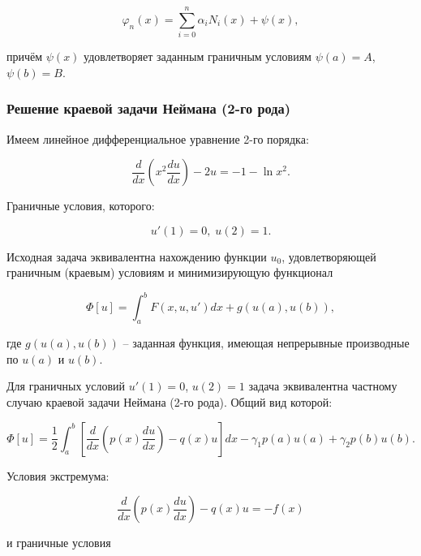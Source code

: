 \documentclass{article}
\begin{document}
\begin{equation}\label{equation_solve_var_rank_2}
	\varphi_{n}(x) = \sum_{i=0}^n \alpha_{i}N_{i}(x) + \psi(x),
\end{equation}

\noindent причём $\psi(x)$ удовлетворяет заданным граничным условиям $\psi(a) = A$, $\psi(b) = B$.

\subsubsection{Решение краевой задачи Неймана (2-го рода)}

Имеем линейное дифференциальное уравнение 2-го порядка:

\begin{equation}\label{equation_rang_2}
	\frac{d}{dx} \left( x^2 \frac{d u}{dx} \right) - 2u = -1 - \ln{x^2}.
\end{equation}

\noindent Граничные условия, которого:

\begin{displaymath}
	u'(1) = 0, \; u(2) = 1.
\end{displaymath}

Исходная задача эквивалентна нахождению функции $u_{0}$, удовлетворяющей граничным (краевым) условиям и минимизирующую функционал

\begin{displaymath}
	\Phi[u] = \int_{a}^{b} F(x, u, u')dx + g(u(a), u(b)),
\end{displaymath}

\noindent где $g(u(a), u(b))$ – заданная функция, имеющая непрерывные производные по $u(a)$ и $u(b)$.

Для граничных условий $u'(1) = 0$, $u(2) = 1$ задача эквивалентна частному случаю краевой задачи Неймана (2-го рода). Общий вид которой:

\begin{displaymath}
	\Phi[u] = \frac{1}{2} \int_{a}^{b} \left[ \frac{d}{dx} \left( p(x) \frac{d u}{dx} \right) - q(x)u \right] dx - \gamma_{1} p(a) u(a) + \gamma_{2} p(b) u(b).
\end{displaymath}

\noindent Условия экстремума:

\begin{displaymath}
	\frac{d}{dx} \left( p(x) \frac{d u}{dx} \right) - q(x)u = -f(x)
\end{displaymath}

\noindent и граничные условия
\end{document}
